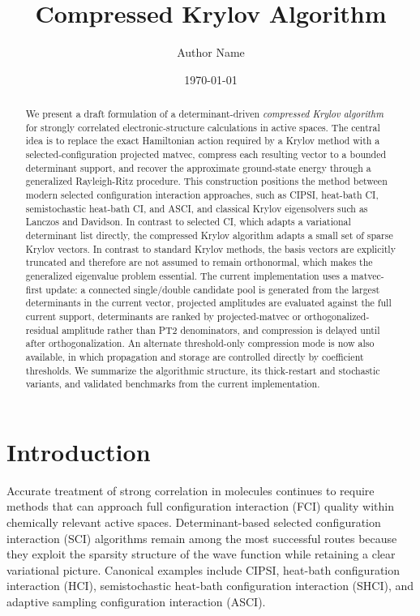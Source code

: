 \documentclass[aip,jcp,preprint,longbibliography]{revtex4-2}
\begin{document}
\title{Compressed Krylov Algorithm}

\author{Author Name}

\date{\today}

\begin{abstract}
We present a draft formulation of a determinant-driven \emph{compressed Krylov algorithm} for strongly correlated electronic-structure calculations in active spaces. The central idea is to replace the exact Hamiltonian action required by a Krylov method with a selected-configuration projected matvec, compress each resulting vector to a bounded determinant support, and recover the approximate ground-state energy through a generalized Rayleigh-Ritz procedure. This construction positions the method between modern selected configuration interaction approaches, such as CIPSI, heat-bath CI, semistochastic heat-bath CI, and ASCI, and classical Krylov eigensolvers such as Lanczos and Davidson. In contrast to selected CI, which adapts a variational determinant list directly, the compressed Krylov algorithm adapts a small set of sparse Krylov vectors. In contrast to standard Krylov methods, the basis vectors are explicitly truncated and therefore are not assumed to remain orthonormal, which makes the generalized eigenvalue problem essential. The current implementation uses a matvec-first update: a connected single/double candidate pool is generated from the largest determinants in the current vector, projected amplitudes are evaluated against the full current support, determinants are ranked by projected-matvec or orthogonalized-residual amplitude rather than PT2 denominators, and compression is delayed until after orthogonalization. An alternate threshold-only compression mode is now also available, in which propagation and storage are controlled directly by coefficient thresholds. We summarize the algorithmic structure, its thick-restart and stochastic variants, and validated benchmarks from the current implementation.
\end{abstract}

\maketitle

\section{Introduction}
Accurate treatment of strong correlation in molecules continues to require methods that can approach full configuration interaction (FCI) quality within chemically relevant active spaces. Determinant-based selected configuration interaction (SCI) algorithms remain among the most successful routes because they exploit the sparsity structure of the wave function while retaining a clear variational picture. Canonical examples include CIPSI,\cite{huron1973cipsi} heat-bath configuration interaction (HCI),\cite{holmes2016hci} semistochastic heat-bath configuration interaction (SHCI),\cite{sharma2017shci} and adaptive sampling configuration interaction (ASCI).\cite{tubman2016asci,tubman2020asci}
\end{document}
